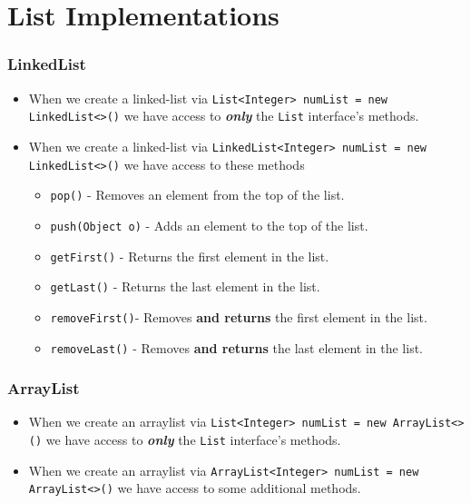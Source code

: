 \documentclass{beamer}
\begin{document}

\section{List Implementations}

\begin{frame}[fragile]
    \frametitle{LinkedList}

    \begin{itemize}
        \item When we create a linked-list via \lstinline|List<Integer> numList = new LinkedList<>()| we have access to \textbf{\textit{only}} the \lstinline|List| interface's methods.
        \item When we create a linked-list via \lstinline|LinkedList<Integer> numList = new LinkedList<>()| we have access to these methods
        \begin{itemize}
            \item \lstinline|pop()| - Removes an element from the top of the list.
            \item \lstinline|push(Object o)| - Adds an element to the top of the list.
            \item \lstinline|getFirst()| - Returns the first element in the list.
            \item \lstinline|getLast()| - Returns the last element in the list.
            \item \lstinline|removeFirst()|- Removes \textbf{and returns} the first element in the list.
            \item \lstinline|removeLast()| - Removes \textbf{and returns} the last element in the list.
        \end{itemize}
    \end{itemize}
\end{frame}

\begin{frame}[fragile]
    \frametitle{ArrayList}
    \begin{itemize}
        \item When we create an arraylist via \lstinline|List<Integer> numList = new ArrayList<>()| we have access to \textit{\textbf{only}} the \lstinline|List| interface's methods.
        \item When we create an arraylist via \lstinline|ArrayList<Integer> numList = new ArrayList<>()| we have access to some additional methods.
    \end{itemize}
\end{frame}
\end{document}
